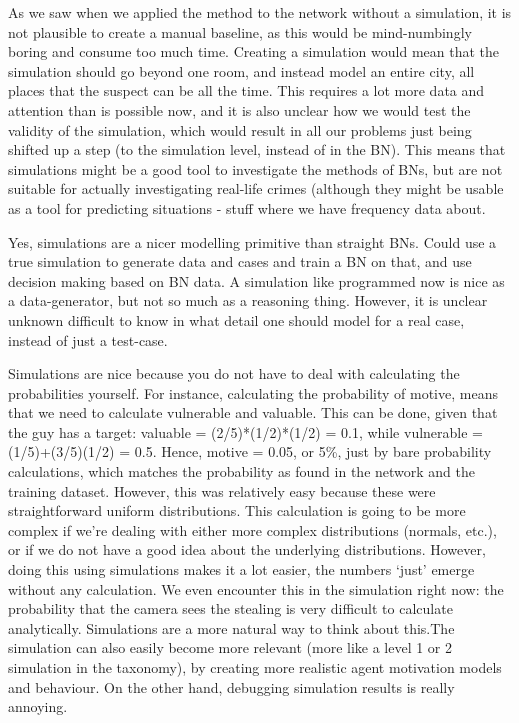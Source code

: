 \documentclass[12pt]{article}
\begin{document}
\begin{enumerate}
As we saw when we applied the method to the network without a simulation, it is not plausible to create a manual baseline, as this would be mind-numbingly boring and consume too much time.  Creating a simulation would mean that the simulation should go beyond one room, and instead model an entire city, all places that the suspect can be all the time. This requires a lot more data and attention than is possible now, and it is also unclear how we would test the validity of the simulation, which would result in all our problems just being shifted up a step (to the simulation level, instead of in the BN). This means that simulations might be a good tool to investigate the methods of BNs, but are not suitable for actually investigating real-life crimes (although they might be usable as a tool for predicting situations - stuff where we have frequency data about.

Yes, simulations are a nicer modelling primitive than straight BNs. Could use a true simulation to generate data and cases and train a BN on that, and use decision making based on BN data. A simulation like programmed now is nice as a data-generator, but not so much as a reasoning thing. However, it is unclear unknown difficult to know in what detail one should model for a real case, instead of just a test-case.

Simulations are nice because you do not have to deal with calculating the probabilities yourself. For instance, calculating the probability of motive, means that we need to calculate vulnerable and valuable. This can be done, given that the guy has a target: valuable = (2/5)*(1/2)*(1/2) = 0.1, while vulnerable = (1/5)+(3/5)(1/2) = 0.5. Hence, motive = 0.05, or 5\%, just by bare probability calculations, which matches the probability as found in the network and the training dataset. However, this was relatively easy because these were straightforward uniform distributions. This calculation is going to be more complex if we're dealing with either more complex distributions (normals, etc.), or if we do not have a good idea about the underlying distributions. However, doing this using simulations makes it a lot easier, the numbers `just' emerge without any calculation. We even encounter this in the simulation right now: the probability that the camera sees the stealing is very difficult to calculate analytically. Simulations are a more natural way to think about this.The simulation can also easily become more relevant (more like a level 1 or 2 simulation in the taxonomy), by creating more realistic agent motivation models and behaviour. On the other hand, debugging simulation results is really annoying.





\end{enumerate}
\end{document}
